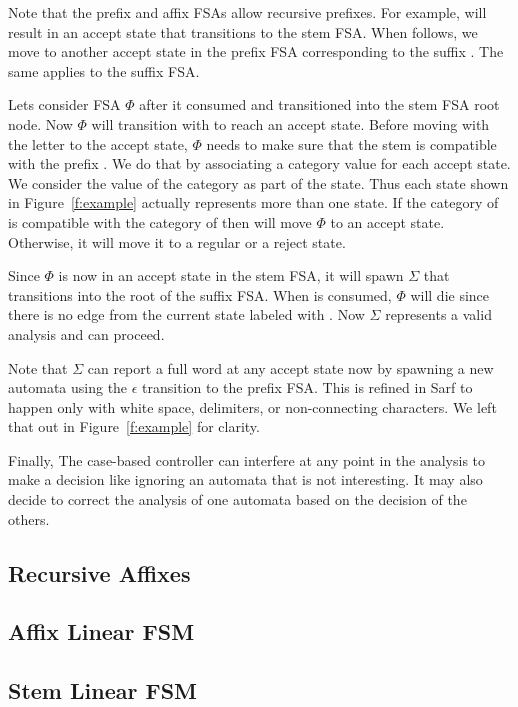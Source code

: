 \documentclass[11pt,letterpaper]{article}
\begin{document}
Note that the prefix and affix FSAs allow recursive 
prefixes. For example,  will result in an accept state
that transitions to the stem FSA. 
When  follows, we move to another accept state in the 
prefix FSA corresponding to the suffix . 
The same applies to the suffix FSA. 

Lets consider FSA $\Phi$ after it consumed  
and transitioned into the stem FSA root node. 
Now $\Phi$ will transition with  to reach an accept 
state. 
Before moving with the letter  to the accept state,
$\Phi$ needs to make sure that the stem  is compatible
with the prefix . 
We do that by associating a category value for each accept state. 
We consider the value of the category as part of the state.
Thus each state shown in Figure~\ref{f:example} actually represents
more than one state. 
If the category of  is compatible with the category of
 then  will move $\Phi$ to an accept state. 
Otherwise, it will move it to a regular or a reject state. 

Since $\Phi$ is now in an accept state in the stem FSA, it will
spawn $\Sigma$ that transitions into the root of the 
suffix FSA. When  is consumed, $\Phi$ will die since 
there is no edge from the current state labeled with . 
Now $\Sigma$ represents a valid analysis and can proceed.

Note that $\Sigma$ can report a full word at any accept state
now by spawning a new automata using the $\epsilon$ transition
to the prefix FSA.
This is refined in Sarf to happen only with white space, delimiters, 
or non-connecting characters. 
We left that out in Figure~\ref{f:example} for clarity. 

Finally, The case-based controller can interfere at any point in the 
analysis to make a decision like ignoring an automata that 
is not interesting. 
It may also decide to correct the analysis of one automata
based on the decision of the others. 


\subsection{Recursive Affixes}


\subsection{Affix Linear FSM}

\subsection{Stem Linear FSM}
\end{document}
